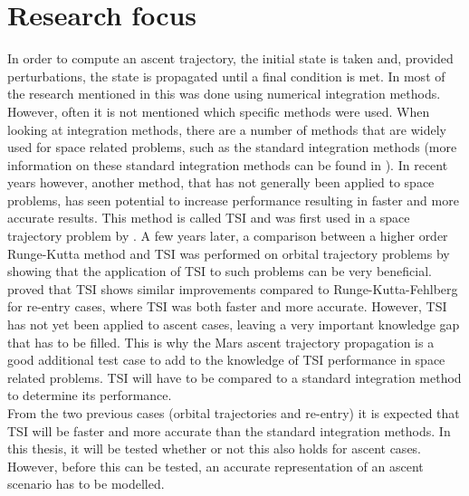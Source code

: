 

\section{Research focus}
\label{sec:researchFocus}
In order to compute an ascent trajectory, the initial state is taken and, provided perturbations, the state is propagated until a final condition is met. In most of the research mentioned in  this was done using numerical integration methods. However, often it is not mentioned which specific methods were used. When looking at integration methods, there are a number of methods that are widely used for space related problems, such as the standard integration methods (more information on these standard integration methods can be found in ). In recent years however, another method, that has not generally been applied to space problems, has seen potential to increase performance resulting in faster and more accurate results. This method is called \acf{TSI} and was first used in a space trajectory problem by \cite{montenbruck1992numerical}. A few years later, a comparison between a higher order Runge-Kutta method and \ac{TSI} was performed on orbital trajectory problems by \cite{scott2008high} showing that the application of \ac{TSI} to such problems can be very beneficial. \cite{bergsma2016application} proved that \ac{TSI} shows similar improvements compared to Runge-Kutta-Fehlberg for re-entry cases, where \ac{TSI} was both faster and more accurate. However, \ac{TSI} has not yet been applied to ascent cases, leaving a very important knowledge gap that has to be filled. This is why the Mars ascent trajectory propagation is a good additional test case to add to the knowledge of \ac{TSI} performance in space related problems. \ac{TSI} will have to be compared to a standard integration method to determine its performance. \\
From the two previous cases (orbital trajectories and re-entry) it is expected that \ac{TSI} will be faster and more accurate than the standard integration methods. In this thesis, it will be tested whether or not this also holds for ascent cases. However, before this can be tested, an accurate representation of an ascent scenario has to be modelled. 
 


